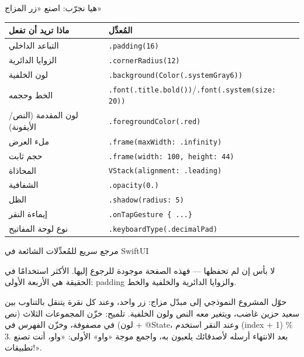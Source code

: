 \begin{tcbpractice}{هيا نجرّب: اصنع «زر المزاج»}

\begin{center}
\begin{tabularx}{\linewidth}{|X|X|}
\hline
\textbf{ماذا تريد أن تفعل} & \textbf{المُعدِّل} \tabularnewline
\hline
التباعد الداخلي & \texttt{.\allowbreak padding(16)} \tabularnewline
الزوايا الدائرية & \texttt{.\allowbreak cornerRadius(12)} \tabularnewline
لون الخلفية & \texttt{.\allowbreak background(Color(.\allowbreak systemGray6))} \tabularnewline
الخط وحجمه & \texttt{.\allowbreak font(.\allowbreak title.\allowbreak bold())}/\texttt{.\allowbreak font(.\allowbreak system(size: 20))} \tabularnewline
لون المقدمة (النص/الأيقونة) & \texttt{.\allowbreak foregroundColor(.\allowbreak red)} \tabularnewline
ملء العرض & \texttt{.\allowbreak frame(maxWidth: .\allowbreak infinity)} \tabularnewline
حجم ثابت & \texttt{.\allowbreak frame(width: 100, height: 44)} \tabularnewline
المحاذاة & \texttt{VStack(alignment: .\allowbreak leading)} \tabularnewline
الشفافية & \texttt{.\allowbreak opacity(0.\allowbreak 6)} \tabularnewline
الظل & \texttt{.\allowbreak shadow(radius: 5)} \tabularnewline
إيماءة النقر & \texttt{.\allowbreak onTapGesture \{ .\allowbreak .\allowbreak .\allowbreak  \}} \tabularnewline
نوع لوحة المفاتيح & \texttt{.\allowbreak keyboardType(.\allowbreak decimalPad)} \tabularnewline
\hline
\end{tabularx}
\end{center}

\begin{center}\small\color{gray}مرجع سريع للمُعدِّلات الشائعة في SwiftUI\end{center}

لا بأس إن لم تحفظها — فهذه الصفحة موجودة للرجوع إليها. الأكثر استخدامًا في الحقيقة هي الأربعة الأولى: padding والزوايا الدائرية والخلفية والخط.

حوّل المشروع النموذجي إلى مبدّل مزاج: زر واحد، وعند كل نقرة يتنقل بالتناوب بين سعيد حزين غاضب، ويتغير معه النص ولون الخلفية. تلميح: خزّن المجموعات الثلاث (نص + لون) في مصفوفة، وخزّن الفهرس في @State، وعند النقر استخدم (index + 1) \% 3. بعد الانتهاء أرسله لأصدقائك يلعبون به، واجمع موجة «واو» الأولى: «واو، أنت تصنع تطبيقات!».

\end{tcbpractice}

